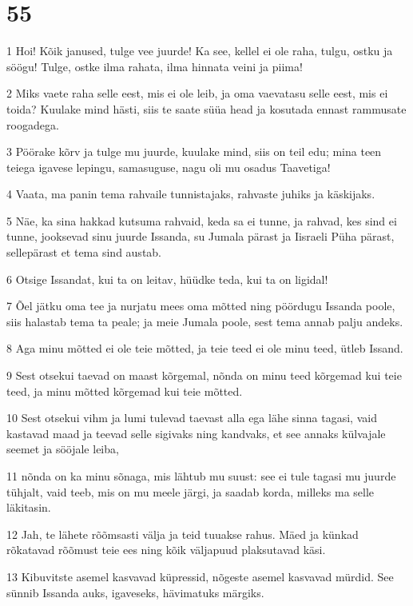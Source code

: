 \chapter{55}

\par 1 Hoi! Kõik janused, tulge vee juurde! Ka see, kellel ei ole raha, tulgu, ostku ja söögu! Tulge, ostke ilma rahata, ilma hinnata veini ja piima!
\par 2 Miks vaete raha selle eest, mis ei ole leib, ja oma vaevatasu selle eest, mis ei toida? Kuulake mind hästi, siis te saate süüa head ja kosutada ennast rammusate roogadega.
\par 3 Pöörake kõrv ja tulge mu juurde, kuulake mind, siis on teil edu; mina teen teiega igavese lepingu, samasuguse, nagu oli mu osadus Taavetiga!
\par 4 Vaata, ma panin tema rahvaile tunnistajaks, rahvaste juhiks ja käskijaks.
\par 5 Näe, ka sina hakkad kutsuma rahvaid, keda sa ei tunne, ja rahvad, kes sind ei tunne, jooksevad sinu juurde Issanda, su Jumala pärast ja Iisraeli Püha pärast, sellepärast et tema sind austab.
\par 6 Otsige Issandat, kui ta on leitav, hüüdke teda, kui ta on ligidal!
\par 7 Õel jätku oma tee ja nurjatu mees oma mõtted ning pöördugu Issanda poole, siis halastab tema ta peale; ja meie Jumala poole, sest tema annab palju andeks.
\par 8 Aga minu mõtted ei ole teie mõtted, ja teie teed ei ole minu teed, ütleb Issand.
\par 9 Sest otsekui taevad on maast kõrgemal, nõnda on minu teed kõrgemad kui teie teed, ja minu mõtted kõrgemad kui teie mõtted.
\par 10 Sest otsekui vihm ja lumi tulevad taevast alla ega lähe sinna tagasi, vaid kastavad maad ja teevad selle sigivaks ning kandvaks, et see annaks külvajale seemet ja sööjale leiba,
\par 11 nõnda on ka minu sõnaga, mis lähtub mu suust: see ei tule tagasi mu juurde tühjalt, vaid teeb, mis on mu meele järgi, ja saadab korda, milleks ma selle läkitasin.
\par 12 Jah, te lähete rõõmsasti välja ja teid tuuakse rahus. Mäed ja künkad rõkatavad rõõmust teie ees ning kõik väljapuud plaksutavad käsi.
\par 13 Kibuvitste asemel kasvavad küpressid, nõgeste asemel kasvavad mürdid. See sünnib Issanda auks, igaveseks, hävimatuks märgiks.


